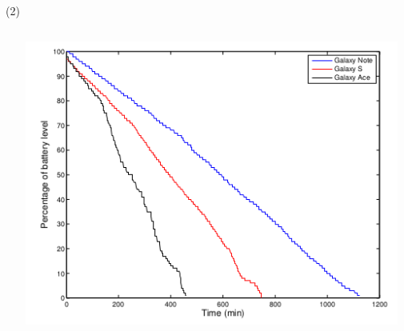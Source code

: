 \begin{frame}{ \footnotemark (2) }
\begin{columns}
\begin{column}{0.29\textwidth}
\begin{center}
     \end{center}
\end{column}
\begin{column}{0.29\textwidth}  
    \begin{center}
	\includegraphics[width=0.97\textwidth]{Figs/DeteccionActividad4}

     \end{center}

\end{column}
\end{columns}
\end{frame}



